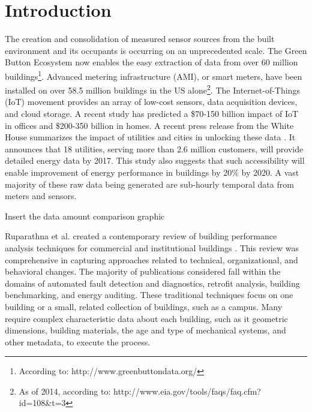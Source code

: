 \section{Introduction}

The creation and consolidation of measured sensor sources from the built environment and its occupants is occurring on an unprecedented scale. The Green Button Ecosystem now enables the easy extraction of data from over 60 million buildings\footnote{According to: http://www.greenbuttondata.org/}. Advanced metering infrastructure (AMI), or smart meters, have been installed on over 58.5 million buildings in the US alone\footnote{As of 2014, according to: http://www.eia.gov/tools/faqs/faq.cfm?id=108&t=3}. The Internet-of-Things (IoT) movement provides an array of low-cost sensors, data acquisition devices, and cloud storage. A recent study has predicted a \$70-150 billion impact of IoT in offices and \$200-350 billion in homes. A recent press release from the White House summarizes the impact of utilities and cities in unlocking these data \cite{the_white_house_fact_2016}. It announces that 18 utilities, serving more than 2.6 million customers, will provide detailed energy data by 2017. This study also suggests that such accessibility will enable improvement of energy performance in buildings by 20\% by 2020. A vast majority of these raw data being generated are sub-hourly temporal data from meters and sensors. 

Insert the data amount comparison graphic

Ruparathna et al. created a contemporary review of building performance analysis techniques for commercial and institutional buildings \cite{ruparathna_improving_2016}. This review was comprehensive in capturing approaches related to technical, organizational, and behavioral changes. The majority of publications considered fall within the domains of automated fault detection and diagnostics, retrofit analysis, building benchmarking, and energy auditing. These traditional techniques focus on one building or a small, related collection of buildings, such as a campus. Many require complex characteristic data about each building, such as it geometric dimensions, building materials, the age and type of mechanical systems, and other metadata, to execute the process. 

